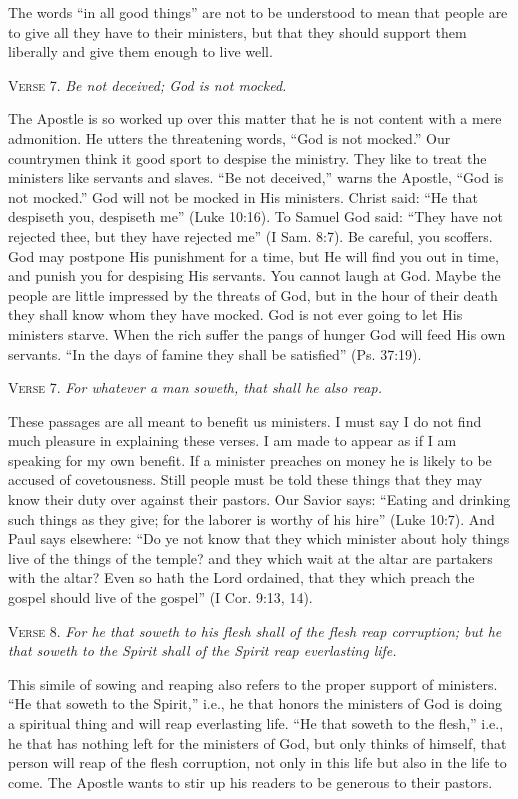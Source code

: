 The words “in all good things” are not to be understood to mean that people are to give all they have to their ministers, but that they should support them liberally and give them enough to live well.

\textsc{Verse} 7. \emph{Be not deceived; God is not mocked.}

The Apostle is so worked up over this matter that he is not content with a mere admonition. He utters the threatening words, “God is not mocked.” Our countrymen think it good sport to despise the ministry. They like to treat the ministers like servants and slaves. “Be not deceived,” warns the Apostle, “God is not mocked.” God will not be mocked in His ministers. Christ said: “He that despiseth you, despiseth me” (Luke 10:16). To Samuel God said: “They have not rejected thee, but they have rejected me” (I Sam. 8:7). Be careful, you scoffers. God may postpone His punishment for a time, but He will find you out in time, and punish you for despising His servants. You cannot laugh at God. Maybe the people are little impressed by the threats of God, but in the hour of their death they shall know whom they have mocked. God is not ever going to let His ministers starve. When the rich suffer the pangs of hunger God will feed His own servants. “In the days of famine they shall be satisfied” (Ps. 37:19).

\textsc{Verse} 7. \emph{For whatever a man soweth, that shall he also reap.}

These passages are all meant to benefit us ministers. I must say I do not find much pleasure in explaining these verses. I am made to appear as if I am speaking for my own benefit. If a minister preaches on money he is likely to be accused of covetousness. Still people must be told these things that they may know their duty over against their pastors. Our Savior says: “Eating and drinking such things as they give; for the laborer is worthy of his hire” (Luke 10:7). And Paul says elsewhere: “Do ye not know that they which minister about holy things live of the things of the temple? and they which wait at the altar are partakers with the altar? Even so hath the Lord ordained, that they which preach the gospel should live of the gospel” (I Cor. 9:13, 14).

\textsc{Verse} 8. \emph{For he that soweth to his flesh shall of the flesh reap corruption; but he that soweth to the Spirit shall of the Spirit reap everlasting life.}

This simile of sowing and reaping also refers to the proper support of ministers. “He that soweth to the Spirit,” i.e., he that honors the ministers of God is doing a spiritual thing and will reap everlasting life. “He that soweth to the flesh,” i.e., he that has nothing left for the ministers of God, but only thinks of himself, that person will reap of the flesh corruption, not only in this life but also in the life to come. The Apostle wants to stir up his readers to be generous to their pastors.

